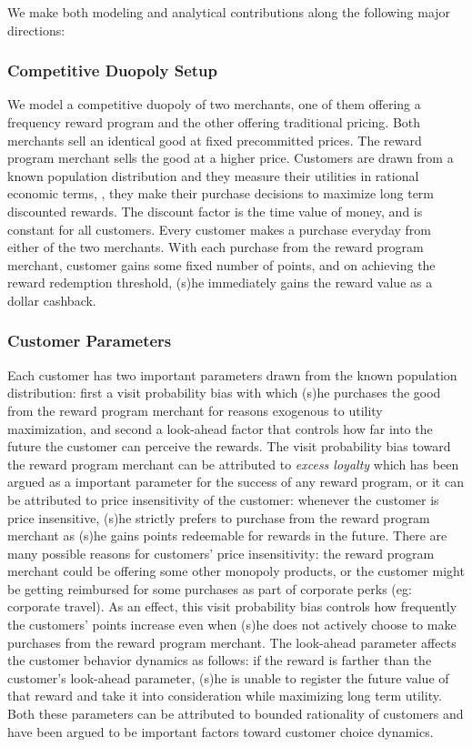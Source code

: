 We make both modeling and analytical contributions along the following major directions:

\subsubsection{Competitive Duopoly Setup}
We model a competitive duopoly of two merchants, one of them offering a frequency reward program and the other offering traditional pricing.
Both merchants sell an identical good at fixed precommitted prices.
The reward program merchant sells the good at a higher price.
Customers are drawn from a known population distribution and they measure their utilities in rational economic terms, \ie, they make their purchase decisions to maximize long term discounted rewards.
The discount factor is the time value of money, and is constant for all customers.
Every customer makes a purchase everyday from either of the two merchants.
With each purchase from the reward program merchant, customer gains some fixed number of points, and on achieving the reward redemption threshold, (s)he immediately gains the reward value as a dollar cashback.

\subsubsection{Customer Parameters}
Each customer has two important parameters drawn from the known population distribution: first a visit probability bias with which (s)he purchases the good from the reward program merchant for reasons exogenous to utility maximization, and second a look-ahead factor that controls how far into the future the customer can perceive the rewards.
The visit probability bias toward the reward program merchant can be attributed to \emph{excess loyalty} which has been argued as a important parameter for the success of any reward program, or it can be attributed to price insensitivity of the customer: whenever the customer is price insensitive, (s)he strictly prefers to purchase from the reward program merchant as (s)he gains points redeemable for rewards in the future.
There are many possible reasons for customers' price insensitivity: the reward program merchant could be offering some other monopoly products, or the customer might be getting reimbursed for some purchases as part of corporate perks (eg: corporate travel).
As an effect, this visit probability bias controls how frequently the customers' points increase even when (s)he does not actively choose to make purchases from the reward program merchant.
The look-ahead parameter affects the customer behavior dynamics as follows: if the reward is farther than the customer's look-ahead parameter, (s)he is unable to register the future value of that reward and take it into consideration while maximizing long term utility.
Both these parameters can be attributed to bounded rationality of customers and have been argued to be important factors toward customer choice dynamics.


